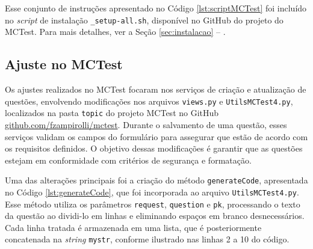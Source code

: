 Esse conjunto de instruções apresentado no Código \ref{lst:scriptMCTest} foi incluído no \textit{script} de instalação \texttt{\_setup-all.sh}, disponível no GitHub do projeto do MCTest. Para mais detalhes, ver a Seção \ref{sec:instalacao} -- .

\subsection{Ajuste no MCTest}\label{sec:contexto}

Os ajustes realizados no MCTest focaram nos serviços de criação e atualização de questões, envolvendo modificações nos arquivos \texttt{views.py} e \texttt{UtilsMCTest4.py}, localizados na pasta \texttt{topic} do projeto MCTest no GitHub \href{https://github.com/fzampirolli/mctest}{github.com/fzampirolli/mctest}. Durante o salvamento de uma questão, esses serviços validam os campos do formulário para assegurar que estão de acordo com os requisitos definidos. O objetivo dessas modificações é garantir que as questões estejam em conformidade com critérios de segurança e formatação.

Uma das alterações principais foi a criação do método \texttt{generateCode}, apresentada no Código \ref{lst:generateCode}, que foi incorporada ao arquivo \texttt{UtilsMCTest4.py}. Esse método utiliza os parâmetros \texttt{request}, \texttt{question} e \texttt{pk}, processando o texto da questão ao dividi-lo em linhas e eliminando espaços em branco desnecessários. Cada linha tratada é armazenada em uma lista, que é posteriormente concatenada na \textit{string} \texttt{mystr}, conforme ilustrado nas linhas 2 a 10 do código.


